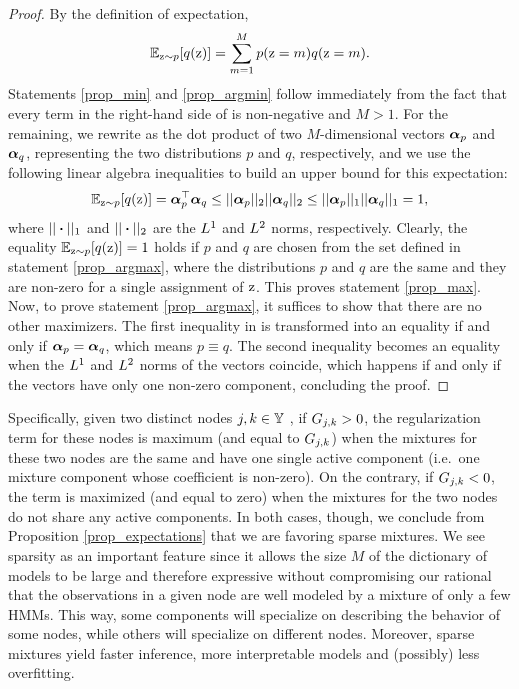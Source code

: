 \begin{proof}
	By the definition of expectation,
	\begin{equation}
	\label{prop_expdef}
	\mathbb{E}_{{\textnormal{z}}\sim p} [ q({\textnormal{z}}) ] = \sum_{m=1}^M p({\textnormal{z}}=m) q({\textnormal{z}}=m).
	\end{equation}
	Statements \ref{prop_min} and \ref{prop_argmin} follow immediately from the fact that every term in the right-hand side of  is non-negative and $M>1$. For the remaining, we rewrite  as the dot product of two $M$-dimensional vectors ${\bm{\alpha}}_p$ and ${\bm{\alpha}}_q$, representing the two distributions $p$ and $q$, respectively, and we use the following linear algebra inequalities to build an upper bound for this expectation:
	\begin{equation}
	\label{prop_ineq}
	\mathbb{E}_{{\textnormal{z}}\sim p} [ q({\textnormal{z}}) ] = {\bm{\alpha}}_p ^\top {\bm{\alpha}}_q \leq || {\bm{\alpha}}_p ||_2 || {\bm{\alpha}}_q ||_2 \leq || {\bm{\alpha}}_p ||_1 || {\bm{\alpha}}_q ||_1 =1,
	\end{equation}
	where $||\boldsymbol{\cdot}||_1$ and $||\boldsymbol{\cdot}||_2$ are the $L^1$ and $L^2$ norms, respectively. Clearly, the equality $\mathbb{E}_{{\textnormal{z}}\sim p} [ q({\textnormal{z}}) ] = 1$ holds if $p$ and $q$ are chosen from the set defined in statement \ref{prop_argmax}, where the distributions $p$ and $q$ are the same and they are non-zero for a single assignment of ${\textnormal{z}}$. This proves statement \ref{prop_max}. Now, to prove statement \ref{prop_argmax}, it suffices to show that there are no other maximizers. The first inequality in  is transformed into an equality if and only if ${\bm{\alpha}}_p = {\bm{\alpha}}_q$, which means $p \equiv q$. The second inequality becomes an equality when the $L^1$ and $L^2$ norms of the vectors coincide, which happens if and only if the vectors have only one non-zero component, concluding the proof.
\end{proof}
Specifically, given two distinct nodes $j, k \in {\mathbb{Y}}$ , if ${G}_{j,k} > 0$, the regularization term for these nodes is maximum (and equal to ${G}_{j,k}$) when the mixtures for these two nodes are the same and have one single active component (i.e.\ one mixture component whose coefficient is non-zero). On the contrary, if ${G}_{j,k} < 0$, the term is maximized (and equal to zero) when the mixtures for the two nodes do not share any active components. In both cases, though, we conclude from Proposition \ref{prop_expectations} that we are favoring sparse mixtures. We see sparsity as an important feature since it allows the size $M$ of the dictionary of models to be large and therefore expressive without compromising our rational that the observations in a given node are well modeled by a mixture of only a few HMMs. This way, some components will specialize on describing the behavior of some nodes, while others will specialize on different nodes. Moreover, sparse mixtures yield faster inference, more interpretable models and (possibly) less overfitting.

